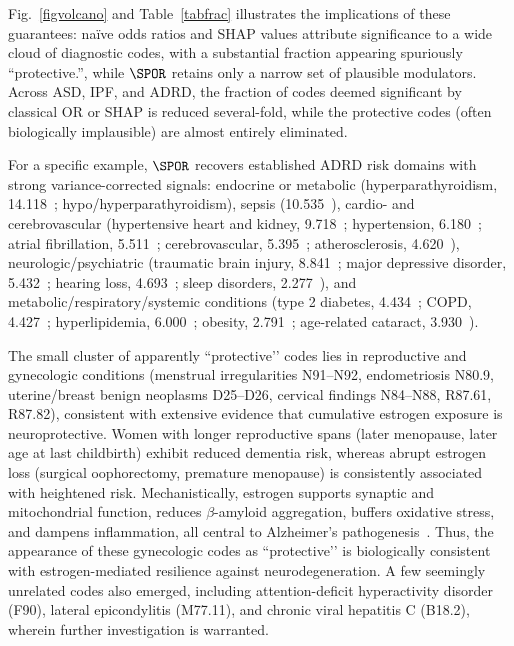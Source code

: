 \documentclass[lineno]{biometrika}
\begin{document}
Fig.~\ref{figvolcano} and Table~\ref{tabfrac}  illustrates the implications of these guarantees:   naïve odds ratios and SHAP values attribute significance to a wide cloud of diagnostic codes, with a substantial fraction appearing spuriously “protective.”, while  $\SPOR$  retains only a narrow set of plausible modulators. Across ASD, IPF, and ADRD, the fraction of codes deemed significant by classical OR or SHAP is reduced several-fold, while the protective codes (often biologically implausible) are almost entirely eliminated.

 For a specific example, $\SPOR$  recovers established ADRD risk domains with strong variance-corrected signals: endocrine or metabolic (hyperparathyroidism, 14.118~\citep{HYPERPARATHYROIDISMmathur2022}; hypo/hyperparathyroidism), sepsis (10.535~\citep{SEPSISzeng2024}), cardio- and cerebrovascular (hypertensive heart and kidney, 9.718~\citep{CKDkelly2022}; hypertension, 6.180~\citep{HYPERTENSIONcarey2023}; atrial fibrillation, 5.511~\citep{ATRIALFIBRpapanastasiou2021}; cerebrovascular, 5.395~\citep{CEREBROVASCULARlove2016}; atherosclerosis, 4.620~\citep{ATHEROSCLEROSISnordestgaard2022}), neurologic/psychiatric (traumatic brain injury, 8.841~\citep{TBIgu2022}; major depressive disorder, 5.432~\citep{DEPRESSIONsaiz2021}; hearing loss, 4.693~\citep{HEARINGlitke2021}; sleep disorders, 2.277~\citep{SLEEPchoe2022}), and metabolic/respiratory/systemic conditions (type 2 diabetes, 4.434~\citep{T2DMathanasaki2022}; COPD, 4.427~\citep{COPDwang2022}; hyperlipidemia, 6.000~\citep{HYPERLIPIDEMIAezkurdia2023}; obesity, 2.791~\citep{OBESITYbeydoun2008}; age-related cataract, 3.930~\citep{CATARACTjun2012}).



The small cluster of apparently ``protective’’ codes lies in reproductive and gynecologic conditions (menstrual irregularities N91–N92, endometriosis N80.9, uterine/breast benign neoplasms D25–D26, cervical findings N84–N88, R87.61, R87.82), consistent with extensive evidence that cumulative estrogen exposure is neuroprotective. Women with longer reproductive spans (later menopause, later age at last childbirth) exhibit reduced dementia risk, whereas abrupt estrogen loss (surgical oophorectomy, premature menopause) is consistently associated with heightened risk. Mechanistically, estrogen supports synaptic and mitochondrial function, reduces $\beta$-amyloid aggregation, buffers oxidative stress, and dampens inflammation, all central to Alzheimer’s pathogenesis~\citep{zarate2017role,Georgakis2016}. Thus, the appearance of these gynecologic codes as “protective’’ is biologically consistent with estrogen-mediated resilience against neurodegeneration.  
A few seemingly unrelated codes also emerged, including attention-deficit hyperactivity disorder (F90), lateral epicondylitis (M77.11), and chronic viral hepatitis C (B18.2),
wherein further investigation is warranted.
\end{document}
